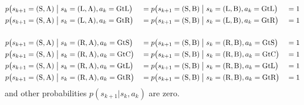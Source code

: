 \begin{alignat}{3}
     & p\bigl(s_{k+1}=(\text{S},\text{A})\bigm|s_k=(\text{L},\text{A}),a_k=\text{GtL}\bigr) &  & =p\bigl(s_{k+1}=(\text{S},\text{B})\bigm|s_k=(\text{L},\text{B}),a_k=\text{GtL}\bigr) &  & = 1 \nonumber \\
     & p\bigl(s_{k+1}=(\text{S},\text{A})\bigm|s_k=(\text{L},\text{A}),a_k=\text{GtR}\bigr) &  & =p\bigl(s_{k+1}=(\text{S},\text{B})\bigm|s_k=(\text{L},\text{B}),a_k=\text{GtR}\bigr) &  & = 1 \nonumber \\[1.5em]
     & p\bigl(s_{k+1}=(\text{S},\text{A})\bigm|s_k=(\text{R},\text{A}),a_k=\text{GtS}\bigr) &  & =p\bigl(s_{k+1}=(\text{S},\text{B})\bigm|s_k=(\text{R},\text{B}),a_k=\text{GtS}\bigr) &  & = 1 \nonumber \\
     & p\bigl(s_{k+1}=(\text{S},\text{A})\bigm|s_k=(\text{R},\text{A}),a_k=\text{GtC}\bigr) &  & =p\bigl(s_{k+1}=(\text{S},\text{B})\bigm|s_k=(\text{R},\text{B}),a_k=\text{GtC}\bigr) &  & = 1 \nonumber \\
     & p\bigl(s_{k+1}=(\text{S},\text{A})\bigm|s_k=(\text{R},\text{A}),a_k=\text{GtL}\bigr) &  & =p\bigl(s_{k+1}=(\text{S},\text{B})\bigm|s_k=(\text{R},\text{B}),a_k=\text{GtL}\bigr) &  & = 1 \nonumber \\
     & p\bigl(s_{k+1}=(\text{S},\text{A})\bigm|s_k=(\text{R},\text{A}),a_k=\text{GtR}\bigr) &  & =p\bigl(s_{k+1}=(\text{S},\text{B})\bigm|s_k=(\text{R},\text{B}),a_k=\text{GtR}\bigr) &  & = 1
\end{alignat}
and other probabilities \(p(s_{k+1}|s_k,a_k)\) are zero.

